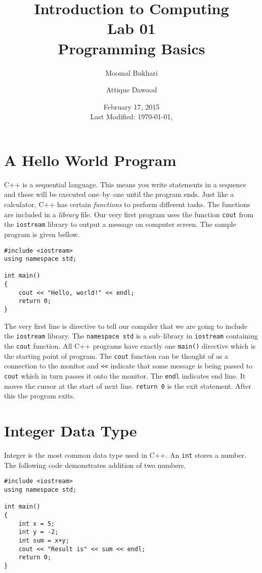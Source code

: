 \documentclass[12pt,a4paper]{article}
\title{Introduction to Computing\\Lab 01\\Programming Basics}
\author{Moomal Bukhari\and Attique Dawood}
\date{February 17, 2015\\[0.2cm] Last Modified: \today, \currenttime}
\begin{document}
\maketitle
\section{A Hello World Program}
C++ is a sequential language. This means you write statements in a sequence and these will be executed one--by--one until the program ends. Just like a calculator, C++ has certain \textit{functions} to perform different tasks. The functions are included in a \textit{library} file. Our very first program uses the function \verb|cout| from the \verb|iostream| library to output a message on computer screen. The sample program is given bellow.
\begin{lstlisting}[caption={Hello World Program}]
#include <iostream> 
using namespace std; 

int main() 
{ 
	cout << "Hello, world!" << endl; 
	return 0; 
}
\end{lstlisting}
The very first line is directive to tell our compiler that we are going to include the \verb|iostream| library. The \verb|namespace std| is a sub--library in \verb|iostream| containing the \verb|cout| function. All C++ programs have exactly one \verb|main()| directive which is the starting point of program. The \verb|cout| function can be thought of as a connection to the monitor and \verb|<<| indicate that some message is being passed to \verb|cout| which in turn passes it onto the monitor. The \verb|endl| indicates end line. It moves the cursor at the start of next line. \verb|return 0| is the exit statement. After this the program exits.
\section{Integer Data Type}
Integer is the most common data type used in C++. An \verb|int| stores a number. The following code demonstrates addition of two numbers.
\begin{lstlisting}[caption={Addition of Two Numbers}]
#include <iostream> 
using namespace std; 

int main() 
{ 
	int x = 5;
	int y = -2;
	int sum = x+y;
	cout << "Result is" << sum << endl;
	return 0; 
}
\end{lstlisting}
\end{document}
